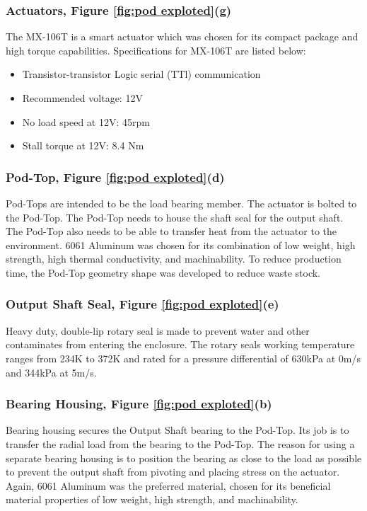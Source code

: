 \subsubsection{Actuators, Figure \ref{fig:pod exploted}(g)}
The MX-106T is a smart actuator which was chosen for its compact package and high torque capabilities. 
Specifications for MX-106T are listed below: 
\begin{itemize}
    \item Transistor-transistor Logic serial (TTl) communication 
    
    \item Recommended voltage: 12V

    \item No load speed at 12V: 45rpm

    \item Stall torque at 12V: 8.4 Nm

\end{itemize}

\subsubsection{Pod-Top, Figure \ref{fig:pod exploted}(d)}
Pod-Tops are intended to be the load bearing member. The actuator is bolted to the Pod-Top. The Pod-Top needs to house the shaft seal for the output shaft. The Pod-Top also needs to be able to transfer heat from the actuator to the environment. 
6061 Aluminum was chosen for its combination of low weight, high strength, high thermal conductivity, and machinability. To reduce production time, the Pod-Top geometry shape was developed to reduce waste stock.

\subsubsection{Output Shaft Seal, Figure \ref{fig:pod exploted}(e)}
Heavy duty, double-lip rotary seal is made to prevent water and other contaminates from entering the enclosure. The rotary seals working temperature ranges from 234K to 372K and rated for a pressure differential of 630kPa at 0m/s and 344kPa at 5m/s. 


\subsubsection{Bearing Housing, Figure \ref{fig:pod exploted}(b)}
Bearing housing secures the Output Shaft bearing to the Pod-Top. Its job is to transfer the radial load from the bearing to the Pod-Top. The reason for using a separate bearing housing is to position the bearing as close to the load as possible to prevent the output shaft from pivoting and placing stress on the actuator.
Again, 6061 Aluminum was the preferred material, chosen for its beneficial material properties of low weight, high strength, and machinability.

